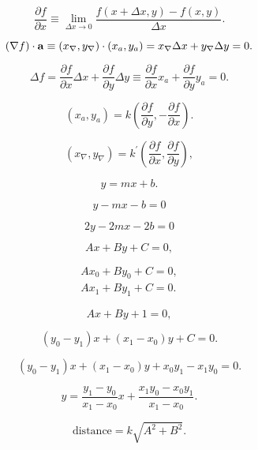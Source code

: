 \[
  {\frac{\partial f}{\partial x}}\equiv\operatorname*{lim}_{\Delta x\to0}{\frac{f(x+\Delta x,y)-f(x,y)}{\Delta x}}.
\]

\begin{equation}
  (\nabla f)\cdot{\bf a}\equiv(x_{\nabla},y_{\nabla})\cdot(x_{a},y_{a})=x_{\nabla}\Delta x+y_{\nabla}\Delta y=0.
\end{equation}

\[
  \Delta f={\frac{\partial f}{\partial x}}\Delta x+{\frac{\partial f}{\partial y}}\Delta y\equiv{\frac{\partial f}{\partial x}}x_{a}+{\frac{\partial f}{\partial y}}y_{a}=0.
\]

\begin{equation}
  (x_{a},y_{a})=k\left({\frac{\partial f}{\partial y}},-{\frac{\partial f}{\partial x}}\right).
\end{equation}

\[
  (x_{\nabla},y_{\nabla})=k^{\prime}\left({\frac{\partial f}{\partial x}},{\frac{\partial f}{\partial y}}\right),
\]

\begin{equation}
  y=mx+b.
\end{equation}

\begin{equation}
  y-mx-b=0
\end{equation}

\[
  2y-2mx-2b=0
\]

\begin{equation}
  Ax+By+C=0,
\end{equation}

\[
  \begin{array}{c}{{A x_{0}+B y_{0}+C=0,}}\\ {{A x_{1}+B y_{1}+C=0.}}\end{array}
\]

\[
  Ax+By+1=0,
\]

\begin{equation}
  (y_{0}-y_{1})x+(x_{1}-x_{0})y+C=0.
\end{equation}

\begin{equation}
  (y_{0}-y_{1})x+(x_{1}-x_{0})y+x_{0}y_{1}-x_{1}y_{0}=0.
\end{equation}

\[
  y={\frac{y_{1}-y_{0}}{x_{1}-x_{0}}}x+{\frac{x_{1}y_{0}-x_{0}y_{1}}{x_{1}-x_{0}}}.
\]

\begin{equation}
  \mathrm{distance}=k\sqrt{A^{2}+B^{2}}.
\end{equation}

